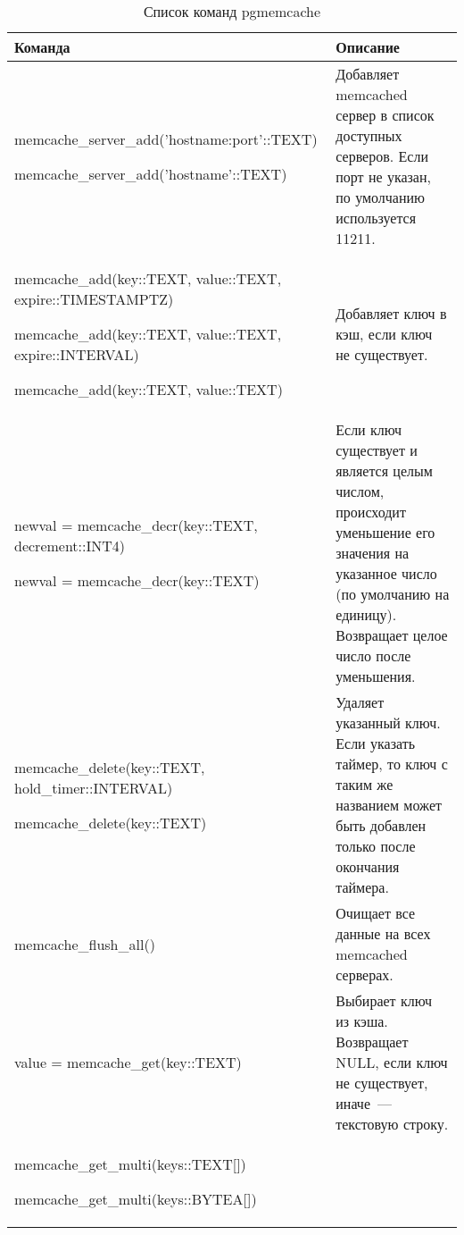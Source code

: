 \begin{table}[h]
\caption{Список команд pgmemcache}
\label{tabular:pgmemcache1}
\begin{tabular}{| >{\raggedright\scriptsize}p{7cm}| >{\scriptsize}p{7cm} |}
\hline
Команда & Описание\\
\hline
memcache\_server\_add('hostname:port'::TEXT)

memcache\_server\_add('hostname'::TEXT)
&
Добавляет memcached сервер в список доступных серверов. Если порт не указан, по умолчанию используется 11211.\\

\hline

memcache\_add(key::TEXT, value::TEXT, expire::TIMESTAMPTZ)

memcache\_add(key::TEXT, value::TEXT, expire::INTERVAL)

memcache\_add(key::TEXT, value::TEXT)
&
Добавляет ключ в кэш, если ключ не существует.\\

\hline

newval = memcache\_decr(key::TEXT, decrement::INT4)

newval = memcache\_decr(key::TEXT)
&
Если ключ существует и является целым числом, происходит уменьшение
его значения на указанное число (по умолчанию на единицу).
Возвращает целое число после уменьшения.\\

\hline

memcache\_delete(key::TEXT, hold\_timer::INTERVAL)

memcache\_delete(key::TEXT)

&
Удаляет указанный ключ. Если указать таймер, то ключ с таким же названием может
быть добавлен только после окончания таймера.\\

\hline

memcache\_flush\_all()

&
Очищает все данные на всех memcached серверах.\\

\hline

value = memcache\_get(key::TEXT)

&
Выбирает ключ из кэша. Возвращает NULL, если ключ не существует, иначе~--- текстовую строку.\\

\hline

memcache\_get\_multi(keys::TEXT[])

memcache\_get\_multi(keys::BYTEA[])


\end{tabular}
\end{table}
